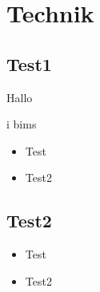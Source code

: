 \section{Technik}


\subsection{Test1}
\begin{frame}



\begin{block}{Hallo}

i bims
\end{block}

\begin{itemize}
\item Test
\item Test2
\end{itemize}
\end{frame}


\subsection{Test2}
\begin{frame}

\begin{itemize}
\item Test
\item Test2
\end{itemize}
\end{frame}